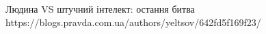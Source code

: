  
 
 
 
 

Людина VS штучний інтелект: остання битва
https://blogs.pravda.com.ua/authors/yeltsov/642fd5f169f23/
